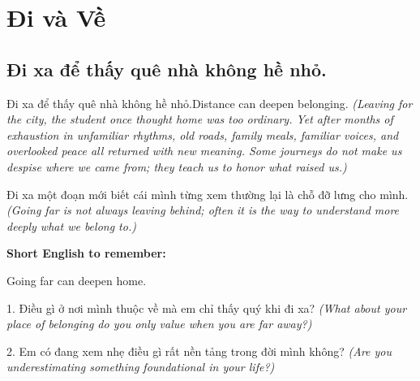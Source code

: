\chapter{Đi và Về}

\section{Đi xa để thấy quê nhà không hề nhỏ.}
\begin{truyen}{Đi xa để thấy quê nhà không hề nhỏ.}{Distance can deepen belonging.}
\textit{(Leaving for the city, the student once thought home was too ordinary. Yet after months of exhaustion in unfamiliar rhythms, old roads, family meals, familiar voices, and overlooked peace all returned with new meaning. Some journeys do not make us despise where we came from; they teach us to honor what raised us.)}
\end{truyen}
\begin{baihoc}
Đi xa một đoạn mới biết cái mình từng xem thường lại là chỗ đỡ lưng cho mình.
\textit{(Going far is not always leaving behind; often it is the way to understand more deeply what we belong to.)}
\end{baihoc}
\begin{ghinhoanh}
\textbf{Short English to remember:}

Going far can deepen home.
\end{ghinhoanh}
\begin{tuhocnhanh}
1. Điều gì ở nơi mình thuộc về mà em chỉ thấy quý khi đi xa? \textit{(What about your place of belonging do you only value when you are far away?)}

2. Em có đang xem nhẹ điều gì rất nền tảng trong đời mình không? \textit{(Are you underestimating something foundational in your life?)}
\end{tuhocnhanh}
\ngancach

